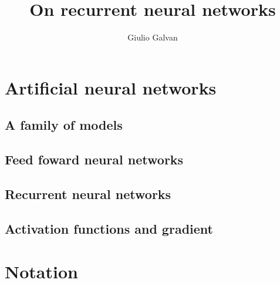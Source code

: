 \documentclass{book}
\title{On recurrent neural networks}
\author{Giulio Galvan}
\theoremstyle{definition}
\theoremstyle{definition}
\begin{document}
\maketitle
\tableofcontents
\chapter{Artificial neural networks}
\section{A family of models}

\section{Feed foward neural networks}

\section{Recurrent neural networks}

\section{Activation functions and gradient}



\appendix
\chapter{Notation}



\newpage
{}

\end{document}
